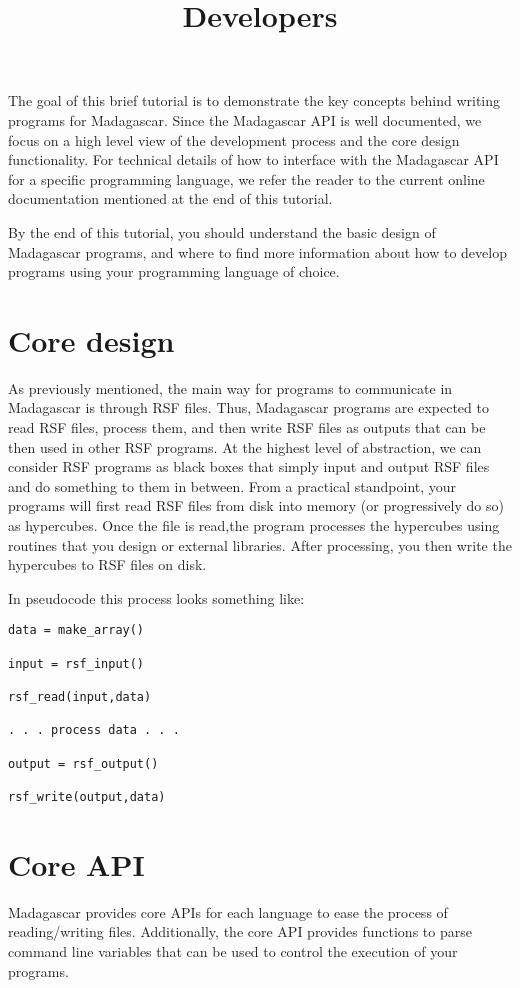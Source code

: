 \title{Developers}

The goal of this brief tutorial is to demonstrate the key concepts
behind writing programs for Madagascar.  Since the Madagascar API is
well documented, we focus on a high level view of the development
process and the core design functionality.  For technical details of
how to interface with the Madagascar API for a specific programming
language, we refer the reader to the current online documentation
mentioned at the end of this tutorial.

By the end of this tutorial, you should understand the basic design of
Madagascar programs, and where to find more information about how to
develop programs using your programming language of choice.

\section{Core design}

As previously mentioned, the main way for programs to communicate in
Madagascar is through RSF files.  Thus, Madagascar programs are
expected to read RSF files, process them, and then write RSF files as
outputs that can be then used in other RSF programs.  At the highest
level of abstraction, we can consider RSF programs as black boxes that
simply input and output RSF files and do something to them in between.
From a practical standpoint, your programs will first read RSF files
from disk into memory (or progressively do so) as hypercubes.  Once
the file is read,the program processes the hypercubes using routines
that you design or external libraries.  After processing, you then
write the hypercubes to RSF files on disk.

In pseudocode this process looks something like:
\begin{verbatim}
data = make_array()

input = rsf_input()

rsf_read(input,data) 

. . . process data . . .

output = rsf_output()

rsf_write(output,data)
\end{verbatim}

\section{Core API}

Madagascar provides core APIs for each language to ease the process of
reading/writing files.  Additionally, the core API provides functions
to parse command line variables that can be used to control the
execution of your programs.


